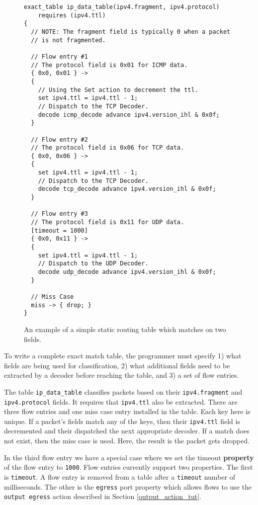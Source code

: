 \begin{figure}
\begin{lstlisting}
exact_table ip_data_table(ipv4.fragment, ipv4.protocol)
	requires (ipv4.ttl)
{
  // NOTE: The fragment field is typically 0 when a packet
  // is not fragmented.
  
  // Flow entry #1 
  // The protocol field is 0x01 for ICMP data.
  { 0x0, 0x01 } ->
  {
    // Using the Set action to decrement the ttl.
  	set ipv4.ttl = ipv4.ttl - 1;
  	// Dispatch to the TCP Decoder.
  	decode icmp_decode advance ipv4.version_ihl & 0x0f;
  } 
  
  // Flow entry #2
  // The protocol field is 0x06 for TCP data.
  { 0x0, 0x06 } ->
  {
  	set ipv4.ttl = ipv4.ttl - 1;
  	// Dispatch to the TCP Decoder.
  	decode tcp_decode advance ipv4.version_ihl & 0x0f;
  } 
  
  // Flow entry #3
  // The protocol field is 0x11 for UDP data.
  [timeout = 1000]
  { 0x0, 0x11 } ->
  {
  	set ipv4.ttl = ipv4.ttl - 1;
  	// Dispatch to the UDP Decoder.
  	decode udp_decode advance ipv4.version_ihl & 0x0f;
  } 
  
  // Miss Case
  miss -> { drop; }
}
\end{lstlisting}
\caption{An example of a simple static routing table which matches on two fields.}
\label{fg:ip_table_ex}
\end{figure}

To write a complete exact match table, the programmer must specify 1) what fields are being used for classification, 2) what additional fields need to be extracted by a decoder before reaching the table, and 3) a set of flow entries. 

The table \texttt{ip\_data\_table} classifies packets based on their \texttt{ipv4.fragment} and \texttt{ipv4.protocol} fields. It requires that \texttt{ipv4.ttl} also be extracted. There are three flow entries and one miss case entry installed in the table. Each key here is unique. If a packet's fields match any of the keys, then their \texttt{ipv4.ttl} field is decremented and their dispatched the next appropriate decoder. If a match does not exist, then the miss case is used. Here, the result is the packet gets dropped. 

In the third flow entry we have a special case where we set the timeout \textbf{property} of the flow entry to \texttt{1000}. Flow entries currently support two properties. The first is \texttt{timeout}. A flow entry is removed from a table after a \texttt{timeout} number of milliseconds. The other is the \texttt{egress} port property which allows flows to use the \texttt{\color{blue}output \color{green}egress} action described in Section \ref{output_action_tut}.

